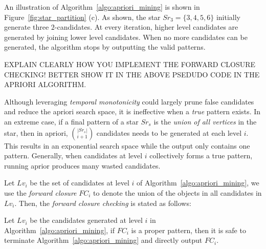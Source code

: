 An illustration of Algorithm~\ref{algo:apriori_mining} is shown in Figure~\ref{fig:star_partition} (c).
As shown, the star $Sr_3=\{3,4,5,6\}$ initially generate three $2$-candidates. At every iteration, 
higher level candidates are generated by joining lower level candidates. When no more candidates 
can be generated, the algorithm stops by outputting the valid patterns.
%










EXPLAIN CLEARLY HOW YOU IMPLEMENT THE FORWARD CLOSURE CHECKING! BETTER SHOW IT IN THE ABOVE PSEDUDO CODE IN THE APRIORI ALGORITHM.

Although leveraging \emph{temporal monotonicity} could largely prune
false candidates and reduce the apriori search space, 
it is ineffective when a \textit{true} pattern exists. 
In an extreme case, if a final pattern of a star $Sr_s$ is 
the \textit{union of all vertices} in the star,
then in apriori, ${|Sr_s|}\choose{i + 1}$ candidates needs to be generated at 
each level $i$. This results in an exponential search space while
the output only contains one pattern.  
Generally, when candidates at level $i$ collectively forms a true pattern, 
running aprior produces many wasted candidates. 

Let $Lv_i$ be the set of candidates at level $i$ of Algorithm~\ref{algo:apriori_mining},
we use the \emph{forward closure} $FC_i$ to denote the union of the objects in
all candidates in $Lv_i$. Then, the \emph{forward closure checking} is stated as follows:
\begin{theorem}
\label{THM:SPM_FCC}
Let $Lv_i$ be the candidates generated at level $i$ in Algorithm~\ref{algo:apriori_mining},
if $FC_i$ is a proper pattern, then it is safe to terminate Algorithm~\ref{algo:apriori_mining}
and directly output $FC_i$.
\end{theorem}


